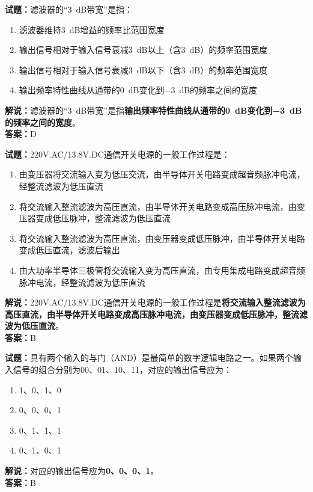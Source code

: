 \documentclass{ctexbook}
\begin{document}
\noindent\textbf{试题：}滤波器的“\SI{3}{\dB}带宽”是指：
\begin{enumerate}[leftmargin=3em]
\item 滤波器维持\SI{3}{\dB}增益的频率比范围宽度
\item 输出信号相对于输入信号衰减\SI{3}{\dB}以上（含\SI{3}{\dB}）的频率范围宽度
\item 输出信号相对于输入信号衰减\SI{3}{\dB}以下（含\SI{3}{\dB}）的频率范围宽度
\item 输出频率特性曲线从通带的\SI{0}{\dB}变化到\SI{-3}{\dB}的频率之间的宽度
\end{enumerate}
\noindent\textbf{解说：}滤波器的“\SI{3}{\dB}带宽”是指\textbf{输出频率特性曲线从通带的\SI{0}{\dB}变化到\SI{-3}{\dB}的频率之间的宽度}。\\\noindent\textbf{答案：}D



\bigskip


\noindent\textbf{试题：}220V.AC/13.8V.DC通信开关电源的一般工作过程是：
\begin{enumerate}[leftmargin=3em]
\item 由变压器将交流输入变为低压交流，由半导体开关电路变成超音频脉冲电流，经整流滤波为低压直流
\item 将交流输入整流滤波为高压直流，由半导体开关电路变成高压脉冲电流，由变压器变成低压脉冲，整流滤波为低压直流
\item 将交流输入整流滤波为高压直流，由变压器变成低压脉冲，由半导体开关电路变成低压直流，滤波后输出
\item 由大功率半导体三极管将交流输入变为高压直流，由专用集成电路变成超音频脉冲电流，经整流滤波为低压直流
\end{enumerate}
\noindent\textbf{解说：}220V.AC/13.8V.DC通信开关电源的一般工作过程是\textbf{将交流输入整流滤波为高压直流，由半导体开关电路变成高压脉冲电流，由变压器变成低压脉冲，整流滤波为低压直流}。\\\noindent\textbf{答案：}B





\bigskip


\noindent\textbf{试题：}具有两个输入的与门（AND）是最简单的数字逻辑电路之一。如果两个输入信号的组合分别为00、01、10、11，对应的输出信号应为：
\begin{enumerate}[leftmargin=3em]
\item 1、0、1、0
\item 0、0、0、1
\item 0、1、1、1
\item 0、1、0、1
\end{enumerate}
\noindent\textbf{解说：}对应的输出信号应为\textbf{0、0、0、1}。\\\noindent\textbf{答案：}B
\end{document}
